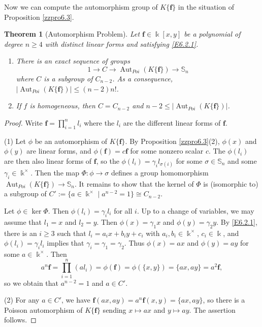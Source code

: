 \documentclass[12pt]{amsart}
\theoremstyle{plain}
\newtheorem{theorem}{Theorem}
\numberwithin{theorem}{section}
\numberwithin{equation}{theorem}
\theoremstyle{definition}
\DeclareMathOperator{\Aut}{Aut}
\newcommand \bff {{\mathbf{f}}}
\newcommand \kx {\Bbbk^\times}
\begin{document}
Now we can compute the automorphism group of $K\{\bff\}$
in the situation of Proposition \ref{zzpro6.3}.

\begin{theorem}[Automorphism Problem]
\label{zzthm6.6}  
Let $\bff\in \Bbbk[x,y]$ be a polynomial
of degree $n \ge 4$ with distinct linear forms and satisfying \eqref{E6.2.1}. 
\begin{enumerate}
\item[(1)]
There is an exact sequence of groups
$$1\to C\to \Aut_{Poi}(K\{\bff\})\to {\mathbb S}_n$$
where $C$ is a subgroup of $C_{n-2}$.
As a consequence, $|{\Aut_{Poi}}(K\{\bff\})|\leq (n-2) n!$.
\item[(2)]
If $f$ is homogeneous, then $C = C_{n-2}$ and $n-2 \le |{\Aut_{Poi}}(K\{\bff\})|$.
\end{enumerate}
\end{theorem}

\begin{proof} Write $\bff=\prod_{i=1}^n l_i$ where
the $l_i$ are the different linear forms 
of $\bff$.

(1) Let $\phi$ be an automorphism of $K\{\bff\}$. By Proposition 
\ref{zzpro6.3}(2), $\phi(x)$ and $\phi(y)$ are linear forms, and $\phi(\bff)=c\bff$ for some nonzero scalar 
$c$.  The $\phi(l_i)$ are then also linear 
forms of $\bff$, so the $\phi(l_i)= \gamma_i l_{\sigma(i)}$ for some 
$\sigma\in {\mathbb S}_n$ and some 
$\gamma_i\in \kx$. Then the map $\Phi:
\phi\to \sigma$ defines a group homomorphism  
$\Aut_{Poi}(K\{\bff\})\to {\mathbb S}_n$. It remains to show that
the kernel of $\Phi$ is (isomorphic to) a subgroup of $C' := \{ a \in \kx \mid a^{n-2} = 1 \} \cong C_{n-2}$. 


Let $\phi\in \ker \Phi$. Then $\phi(l_i)= \gamma_i l_i$
for all $i$. Up to a change of variables,
we may assume that $l_1=x$ and $l_2=y$. Then
$\phi(x)= \gamma_1 x$ and $\phi(y)= \gamma_2 y$. By \eqref{E6.2.1}, there is an $i \ge 3$ such that $l_i = a_i x + b_i y + c_i$ with $a_i,b_i \in \kx$, $c_i \in \Bbbk$, and
$\phi(l_i)=\gamma_i l_i$ implies that $\gamma_{i}=\gamma_1=\gamma_2$.  Thus $\phi(x)=ax$ and $\phi(y)=ay$ for 
some $a\in \Bbbk^{\times}$.
Then 
$$
a^n \bff = \prod_{i=1}^n (al_i) = \phi(\bff) = \phi(\{x,y\}) = \{ax,ay\} = a^2 \bff,
$$
so we obtain
that $a^{n-2}=1$ and $a \in C'$.

(2) For any $a \in C'$, we have $\bff(ax,ay) = a^n \bff(x,y) = \{ax,ay\}$, so there is a Poisson
automorphism of $K\{\bff\}$ sending $x \mapsto ax$ and $y \mapsto ay$. The assertion follows.
\end{proof}
\end{document}
